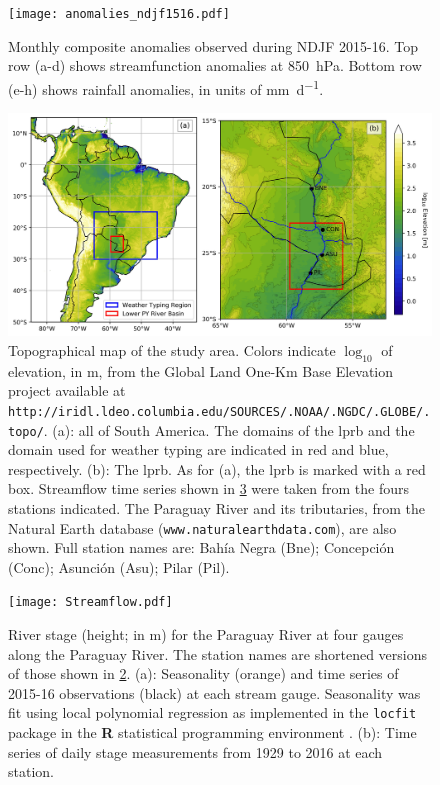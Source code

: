 \documentclass[twocol]{ametsoc}
\begin{document}
\begin{figure}
	\noindent\texttt{[image: anomalies\_ndjf1516.pdf]}
	\caption{
		Monthly composite anomalies observed during NDJF 2015-16.
		Top row (a-d) shows streamfunction anomalies at \SI{850}{\hecto\pascal}.
		Bottom row (e-h) shows rainfall anomalies, in units of \si{\milli\meter\per\day}.
	}\label{fig:anomalies}
\end{figure}

\begin{figure}
	\noindent\includegraphics[width=6.5in]{study_area.jpg}
	\caption{
		Topographical map of the study area.
		Colors indicate $\log_{10}$ of elevation, in \si{\meter}, from the Global Land One-Km Base Elevation project available at \texttt{http://iridl.ldeo.columbia.edu/SOURCES/.NOAA/.NGDC/.GLOBE/.topo/}.
		(a): all of South America.
		The domains of the \acrlong{lprb} and the domain used for weather typing are indicated in red and blue, respectively.
		(b): The \acrfull{lprb}.
		As for (a), the \gls{lprb} is marked with a red box.
		Streamflow time series shown in \cref{fig:streamflow} were taken from the fours stations indicated.
		The Paraguay River and its tributaries, from the Natural Earth database (\texttt{www.naturalearthdata.com}), are also shown.
		Full station names are: Bah\'ia Negra (Bne); Concepci\'on (Conc); Asunci\'on (Asu); Pilar (Pil).
	}\label{fig:study-area}
\end{figure}

\begin{figure}
	\noindent\texttt{[image: Streamflow.pdf]}
	\caption{
		River stage (height; in \si{\meter}) for the Paraguay River at four gauges along the Paraguay River.
		The station names are shortened versions of those shown in \cref{fig:study-area}.
		(a): Seasonality (orange) and time series of 2015-16 observations (black) at each stream gauge.
		Seasonality was fit using local polynomial regression as implemented in the \texttt{locfit} package in the \textbf{R} statistical programming environment \citep{Loader1999}.
		(b): Time series of daily stage measurements from 1929 to 2016 at each station.
	}\label{fig:streamflow}
\end{figure}
\end{document}
